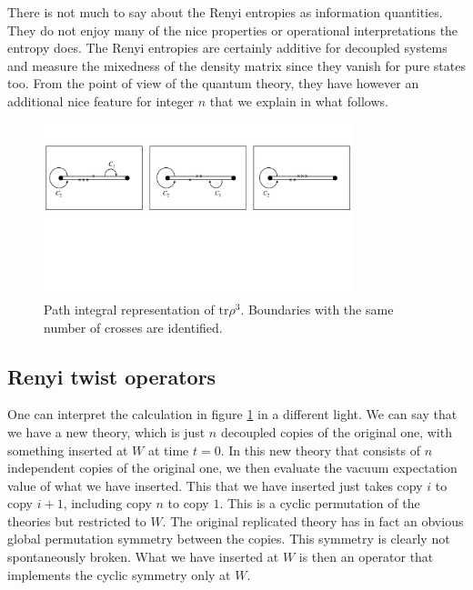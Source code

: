 \documentclass[12pt]{article}
\numberwithin{equation}{section}
\begin{document}
There is not much to say about the Renyi entropies as information quantities. They do not enjoy many of the nice properties or operational interpretations the entropy does. The Renyi entropies are certainly additive for decoupled systems and measure the mixedness of the density matrix since they vanish for pure states too. From the point of view of the quantum theory, they have however an additional nice feature for integer $n$ that we explain in what follows.   

\begin{figure}[t]
\begin{center}  
\includegraphics[width=0.8\textwidth]{replica2.pdf}
\captionsetup{width=0.9\textwidth}
\caption{Path integral representation of $\textrm{tr} \rho^3$. Boundaries with the same number of crosses are identified.}
\label{replica1}
\end{center}  
\end{figure}


\subsection{Renyi twist operators}
One can interpret the calculation in figure \ref{replica1} in a different light. We can say that we have a new theory, which is just $n$ decoupled copies of the original one, with something inserted at $W$ at time $t=0$. In this new theory that consists of $n$ independent copies of the original one, we then evaluate the vacuum expectation value of what we have inserted. This that we have inserted just takes copy $i$ to copy $i+1$, including copy $n$ to copy $1$. This is a cyclic permutation of the theories but restricted to $W$. The original replicated theory has in fact an obvious global permutation symmetry between the copies. This symmetry is clearly not spontaneously broken. What we have inserted at $W$ is then an operator that implements the cyclic symmetry only at $W$. 
\end{document}

